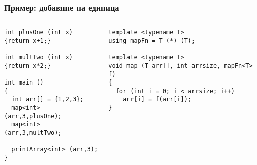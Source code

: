 \documentclass{beamer}
\begin{document}
\begin{frame}[fragile]
\frametitle{Пример: добавяне на единица}


\begin{columns}[t]
  \begin{column}{0.5\textwidth}

\begin{flushleft}
\begin{lstlisting}
int plusOne (int x)
{return x+1;}

int multTwo (int x)
{return x*2;}

int main ()
{
  int arr[] = {1,2,3};
  map<int> (arr,3,plusOne);
  map<int> (arr,3,multTwo);

  printArray<int> (arr,3);
}

\end{lstlisting}  
\end{flushleft}
  \end{column}
  \begin{column}{0.5\textwidth}
\begin{flushleft}
\begin{lstlisting}
template <typename T>
using mapFn = T (*) (T);

template <typename T>
void map (T arr[], int arrsize, mapFn<T> f)
{
  for (int i = 0; i < arrsize; i++)
    arr[i] = f(arr[i]);
}
\end{lstlisting}  
\end{flushleft}

  \end{column}
\end{columns}


\end{frame}
\end{document}

